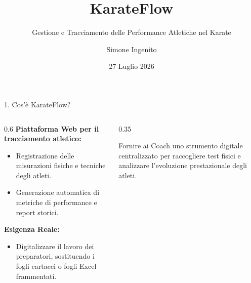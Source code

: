 \documentclass[aspectratio=169, 10pt]{beamer}
\title[KarateFlow - Testing]{KarateFlow}
\subtitle{Gestione e Tracciamento delle Performance Atletiche nel Karate}
\author[Simone Ingenito]{Simone Ingenito}
\institute[UNINA]{Corso di Software Testing}
\date[Luglio 2026]{27 Luglio 2026}
\begin{document}
\begin{frame}[plain]
  \titlepage
\end{frame}\begin{frame}{1. Cos'è KarateFlow?}
  \begin{columns}
    \begin{column}{0.6\textwidth}
      \textbf{Piattaforma Web per il tracciamento atletico:}
      \begin{itemize}
        \item Registrazione delle misurazioni fisiche e tecniche degli atleti.
        \item Generazione automatica di metriche di performance e report storici.
      \end{itemize}
      \vspace{0.3cm}
      \textbf{Esigenza Reale:}
      \begin{itemize}
        \item Digitalizzare il lavoro dei preparatori, sostituendo i fogli cartacei o fogli Excel frammentati.
      \end{itemize}
    \end{column}
    \begin{column}{0.35\textwidth}
      \begin{tcolorbox}[colback=karateRed!10, colframe=karateRed, title=Value Proposition]
        Fornire ai Coach uno strumento digitale centralizzato per raccogliere test fisici e analizzare l'evoluzione prestazionale degli atleti.
      \end{tcolorbox}
    \end{column}
  \end{columns}
\end{frame}
\end{document}
